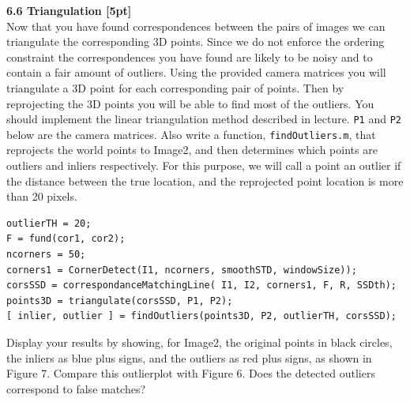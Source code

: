 \documentclass{assignment}
\begin{document}
\begin{problemlist}
\newpage
\textbf{6.6 Triangulation [5pt]}\\
Now that you have found correspondences between the pairs of images we can triangulate the corresponding 3D points. Since we do not enforce the ordering constraint the correspondences you have found are likely to be noisy and to contain a fair amount of outliers. Using the provided camera matrices you will triangulate a 3D point for each corresponding pair of points. Then by reprojecting the 3D points you will be able to find most of the outliers. You should implement the linear triangulation method described in lecture. \texttt{P1} and \texttt{P2} below are the camera matrices. Also write a function, \texttt{findOutliers.m}, that reprojects the world points to Image2, and then determines which points are outliers and inliers respectively. For this purpose, we will call a point an outlier if the distance between the true location, and the reprojected point location is more than 20 pixels.\\
\begin{lstlisting}
outlierTH = 20;
F = fund(cor1, cor2);
ncorners = 50;
corners1 = CornerDetect(I1, ncorners, smoothSTD, windowSize));
corsSSD = correspondanceMatchingLine( I1, I2, corners1, F, R, SSDth);
points3D = triangulate(corsSSD, P1, P2);
[ inlier, outlier ] = findOutliers(points3D, P2, outlierTH, corsSSD);
\end{lstlisting}
Display your results by showing, for Image2, the original points in black circles, the inliers as blue plus signs, and the outliers as red plus signs, as shown in Figure 7. Compare this outlierplot with Figure 6. Does the detected outliers correspond to false matches?


\end{problemlist}
\end{document}
